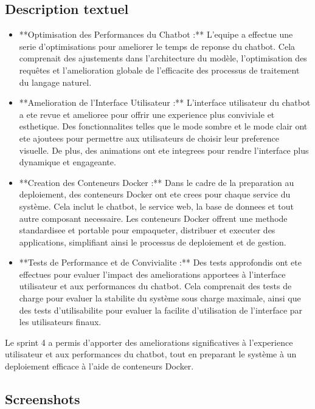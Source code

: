 \documentclass[a4paper, 11pt, openany]{report}
\begin{document}
\subsection{Description textuel}
\begin{itemize}
    \item **Optimisation des Performances du Chatbot :** L'equipe a effectue une serie d'optimisations pour ameliorer le temps de reponse du chatbot. Cela comprenait des ajustements dans l'architecture du modèle, l'optimisation des requêtes et l'amelioration globale de l'efficacite des processus de traitement du langage naturel.
    
    \item **Amelioration de l'Interface Utilisateur :** L'interface utilisateur du chatbot a ete revue et amelioree pour offrir une experience plus conviviale et esthetique. Des fonctionnalites telles que le mode sombre et le mode clair ont ete ajoutees pour permettre aux utilisateurs de choisir leur preference visuelle. De plus, des animations ont ete integrees pour rendre l'interface plus dynamique et engageante.
    
    \item **Creation des Conteneurs Docker :** Dans le cadre de la preparation au deploiement, des conteneurs Docker ont ete crees pour chaque service du système. Cela inclut le chatbot, le service web, la base de donnees et tout autre composant necessaire. Les conteneurs Docker offrent une methode standardisee et portable pour empaqueter, distribuer et executer des applications, simplifiant ainsi le processus de deploiement et de gestion.
    
    \item **Tests de Performance et de Convivialite :** Des tests approfondis ont ete effectues pour evaluer l'impact des ameliorations apportees à l'interface utilisateur et aux performances du chatbot. Cela comprenait des tests de charge pour evaluer la stabilite du système sous charge maximale, ainsi que des tests d'utilisabilite pour evaluer la facilite d'utilisation de l'interface par les utilisateurs finaux.
\end{itemize}

Le sprint 4 a permis d'apporter des ameliorations significatives à l'experience utilisateur et aux performances du chatbot, tout en preparant le système à un deploiement efficace à l'aide de conteneurs Docker.

\subsection{Screenshots}
\end{document}
